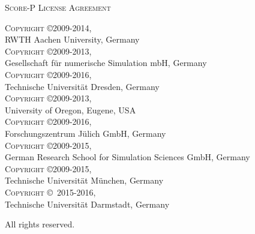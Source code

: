 \begin{center}
  \textsc{\LARGE Score-P License Agreement}
\end{center}

\textsc{Copyright \copyright 2009-2014,} \\
\hspace*{10mm}RWTH Aachen University, Germany \\
\textsc{Copyright \copyright 2009-2013,} \\
\hspace*{10mm}Gesellschaft f{\"u}r numerische Simulation mbH, Germany \\
\textsc{Copyright \copyright 2009-2016,} \\
\hspace*{10mm}Technische Universit{\"a}t Dresden, Germany \\
\textsc{Copyright \copyright 2009-2013,} \\
\hspace*{10mm}University of Oregon, Eugene, USA \\
\textsc{Copyright \copyright 2009-2016,} \\
\hspace*{10mm}Forschungszentrum J{\"u}lich GmbH, Germany \\
\textsc{Copyright \copyright 2009-2015,} \\
\hspace*{10mm}German Research School for Simulation Sciences GmbH, Germany \\
\textsc{Copyright \copyright 2009-2015,} \\
\hspace*{10mm}Technische Universit{\"a}t M{\"u}nchen, Germany \\
\textsc{Copyright \copyright\, 2015-2016,} \\
\hspace*{10mm}Technische Universit{\"a}t Darmstadt, Germany

All rights reserved.
\vfill

